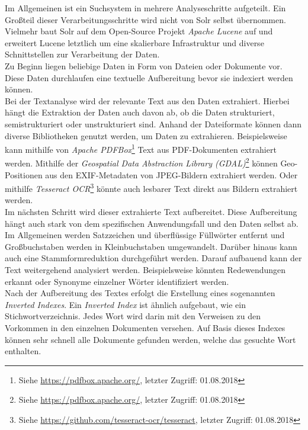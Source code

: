 \noindent
Im Allgemeinen ist ein Suchsystem in mehrere Analyseschritte aufgeteilt. Ein Großteil dieser Verarbeitungsschritte wird nicht von Solr selbst übernommen. Vielmehr baut Solr auf dem Open-Source Projekt \textit{Apache Lucene\texttrademark\thinspace} auf und erweitert Lucene letztlich um eine skalierbare Infrastruktur und diverse Schnittstellen zur Verarbeitung der Daten.\\
Zu Beginn liegen beliebige Daten in Form von Dateien oder Dokumente vor. Diese Daten durchlaufen eine textuelle Aufbereitung bevor sie indexiert werden können.\\ 
Bei der Textanalyse wird der relevante Text aus den Daten extrahiert. Hierbei hängt die Extraktion der Daten auch davon ab, ob die Daten strukturiert, semistrukturiert oder unstrukturiert sind. Anhand der Dateiformate können dann diverse Bibliotheken genutzt werden, um Daten zu extrahieren. Beispielsweise kann mithilfe von \textit{Apache PDFBox\textsuperscript{\textregistered}}\footnote{Siehe \url{https://pdfbox.apache.org/}, letzter Zugriff: 01.08.2018} Text aus PDF-Dokumenten extrahiert werden. Mithilfe der \textit{Geospatial Data Abstraction Library (GDAL)}\footnote{Siehe \url{https://pdfbox.apache.org/}, letzter Zugriff: 01.08.2018} können Geo-Positionen aus den EXIF-Metadaten von JPEG-Bildern extrahiert werden. Oder mithilfe \textit{Tesseract OCR}\footnote{Siehe \url{https://github.com/tesseract-ocr/tesseract}, letzter Zugriff: 01.08.2018} könnte auch lesbarer Text direkt aus Bildern extrahiert werden.\cite[S. 39]{solr_search}\\

\noindent
Im nächsten Schritt wird dieser extrahierte Text aufbereitet. Diese Aufbereitung hängt auch stark von dem spezifischen Anwendungsfall und den Daten selbst ab. Im Allgemeinen werden Satzzeichen und überflüssige Füllwörter entfernt und Großbuchstaben werden in Kleinbuchstaben umgewandelt. Darüber hinaus kann auch eine Stammformreduktion durchgeführt werden. Darauf aufbauend kann der Text weitergehend analysiert werden. Beispielsweise könnten Redewendungen erkannt oder Synonyme einzelner Wörter identifiziert werden.\cite[S.44]{solr_search}\\

\noindent
Nach der Aufbereitung des Textes erfolgt die Erstellung eines sogenannten \textit{Inverted Indexes}. Ein \textit{Inverted Index} ist ähnlich aufgebaut, wie ein Stichwortverzeichnis. Jedes Wort wird darin mit den Verweisen zu den Vorkommen in den einzelnen Dokumenten versehen. Auf Basis dieses Indexes können sehr schnell alle Dokumente gefunden werden, welche das gesuchte Wort enthalten.\cite[S. 47]{solr_search}

